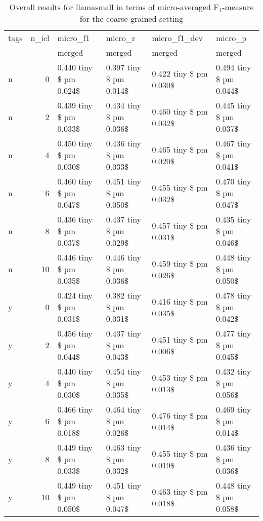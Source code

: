 \begin{table}
\caption{Overall results for llamasmall in terms of micro-averaged F$_1$-measure for the coarse-grained setting}
\label{tab:coarse-overall}
\begin{tabular}{lrllll}
\toprule
tags & n\_icl & micro\_f1 & micro\_r & micro\_f1\_dev & micro\_p \\
 &  & merged & merged & merged & merged \\
\midrule
n & 0 & 0.440 tiny \$ pm 0.024\$ & 0.397 tiny \$ pm 0.014\$ & 0.422 tiny \$ pm 0.030\$ & 0.494 tiny \$ pm 0.044\$ \\
n & 2 & 0.439 tiny \$ pm 0.033\$ & 0.434 tiny \$ pm 0.036\$ & 0.460 tiny \$ pm 0.032\$ & 0.445 tiny \$ pm 0.037\$ \\
n & 4 & 0.450 tiny \$ pm 0.030\$ & 0.436 tiny \$ pm 0.033\$ & 0.465 tiny \$ pm 0.020\$ & 0.467 tiny \$ pm 0.041\$ \\
n & 6 & 0.460 tiny \$ pm 0.047\$ & 0.451 tiny \$ pm 0.050\$ & 0.455 tiny \$ pm 0.032\$ & 0.470 tiny \$ pm 0.047\$ \\
n & 8 & 0.436 tiny \$ pm 0.037\$ & 0.437 tiny \$ pm 0.029\$ & 0.457 tiny \$ pm 0.031\$ & 0.435 tiny \$ pm 0.046\$ \\
n & 10 & 0.446 tiny \$ pm 0.035\$ & 0.446 tiny \$ pm 0.036\$ & 0.459 tiny \$ pm 0.026\$ & 0.448 tiny \$ pm 0.050\$ \\
y & 0 & 0.424 tiny \$ pm 0.031\$ & 0.382 tiny \$ pm 0.031\$ & 0.416 tiny \$ pm 0.035\$ & 0.478 tiny \$ pm 0.042\$ \\
y & 2 & 0.456 tiny \$ pm 0.044\$ & 0.437 tiny \$ pm 0.043\$ & 0.451 tiny \$ pm 0.006\$ & 0.477 tiny \$ pm 0.045\$ \\
y & 4 & 0.440 tiny \$ pm 0.030\$ & 0.454 tiny \$ pm 0.035\$ & 0.453 tiny \$ pm 0.013\$ & 0.432 tiny \$ pm 0.056\$ \\
y & 6 & 0.466 tiny \$ pm 0.018\$ & 0.464 tiny \$ pm 0.026\$ & 0.476 tiny \$ pm 0.014\$ & 0.469 tiny \$ pm 0.014\$ \\
y & 8 & 0.449 tiny \$ pm 0.033\$ & 0.463 tiny \$ pm 0.032\$ & 0.455 tiny \$ pm 0.019\$ & 0.436 tiny \$ pm 0.036\$ \\
y & 10 & 0.449 tiny \$ pm 0.050\$ & 0.451 tiny \$ pm 0.047\$ & 0.463 tiny \$ pm 0.018\$ & 0.448 tiny \$ pm 0.058\$ \\
\bottomrule
\end{tabular}
\end{table}
